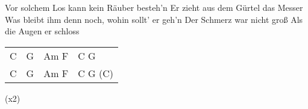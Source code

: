 \begin{guitar}
	Vor solchem Los kann kein Räuber besteh'n
	Er zieht aus dem Gürtel das Messer
	Was bleibt ihm denn noch, wohin sollt' er geh'n
	Der Schmerz war nicht groß
	Als die Augen er schloss

	 {\footnotesize\begin{tabular}{l|l|l|l}
			C & G & Am F & C G \\
			C & G & Am F & C G (C) 
	\end{tabular}}

	  (x2)	
\end{guitar}